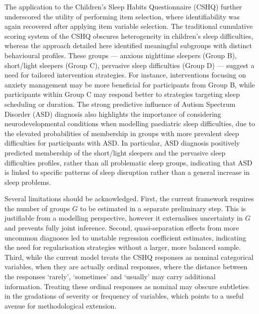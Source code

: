 \documentclass[11pt]{article}
\theoremstyle{plain}
\theoremstyle{definition}
\begin{document}
The application to the Children's Sleep Habits Questionnaire (CSHQ) further underscored the utility of performing item selection, where identifiability was again recovered after applying item variable selection. The traditional cumulative scoring system of the CSHQ obscures heterogeneity  in children's sleep difficulties, whereas the approach detailed here identified meaningful subgroups with distinct behavioural profiles. These groups --- anxious nighttime sleepers (Group B), short/light sleepers (Group C), pervasive sleep difficulties (Group D) --- suggest a need for tailored intervention strategies. For instance, interventions focusing on anxiety management may be more beneficial for participants from Group B, while participants within Group C may respond better to strategies targeting sleep scheduling or duration. The strong predictive influence of Autism Spectrum Disorder (ASD) diagnosis also highlights the importance of considering neurodevelopmental conditions when modelling paediatric sleep difficulties, due to the elevated probabilities of membership in groups with more prevalent sleep difficulties for participants with ASD. In particular, ASD diagnosis positively predicted membership of the short/light sleepers and the pervasive sleep difficulties profiles, rather than all problematic sleep groups, indicating that ASD is linked to specific patterns of sleep disruption rather than a general increase in sleep problems. 

Several limitations should be acknowledged. First, the current framework requires the number of groups $G$ to be estimated in a separate preliminary step. This is justifiable from a modelling perspective, however it externalises uncertainty in $G$ and prevents fully joint inference. Second, quasi-separation effects from more uncommon diagnoses led to unstable regression coefficient estimates, indicating the need for regularisation strategies without a larger, more balanced sample. Third, while the current model treats the CSHQ responses as nominal categorical variables, when they are actually ordinal responses, where the distance between the responses `rarely', `sometimes' and `usually' may carry additional information. Treating these ordinal responses as nominal may obscure subtleties in the gradations of severity or frequency of variables, which points to a useful avenue for methodological extension.
\end{document}
